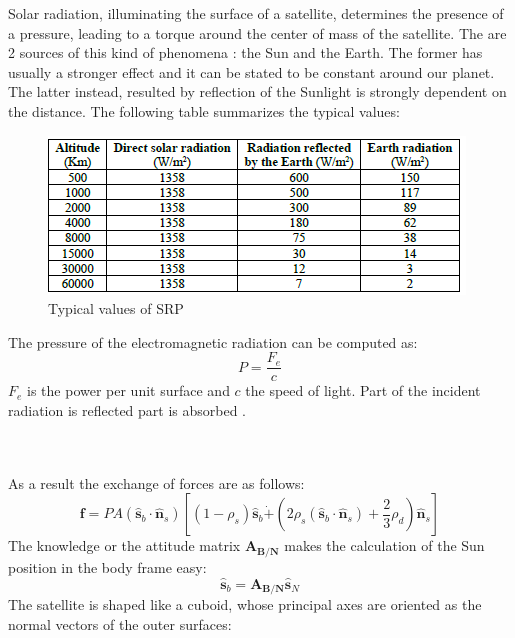 \documentclass[11pt]{article}
\begin{document}
Solar radiation, illuminating the surface of a satellite, determines the presence of a pressure, leading to a torque around the center of mass of the satellite. The are 2 sources of this kind of phenomena : the Sun and the Earth. The former has usually a stronger effect and it can be stated to be constant around our planet.  The latter instead, resulted by reflection of the Sunlight is strongly dependent on the distance. The following table summarizes the typical values:\\
\begin{minipage}{.6\textwidth}
\begin{figure} [H]
\centering 
\includegraphics[scale=1.1]{SRP1.PNG}
\caption{ Typical values of  SRP 
\cite{SRP}}
\end{figure}
\end{minipage}
\begin{minipage}{.4\textwidth}
The pressure of the electromagnetic radiation can be computed as:
\begin{equation}
P=\frac{F_e}{c}
\end{equation}
$ F_e$ is the power per unit surface and $ c$ the speed of light. 
Part of the incident radiation is reflected part is absorbed .
\end{minipage}\\\\
As a result the exchange of forces are as follows:
\begin{equation}
\mathbf{f}=PA(\hat{\mathbf{s}}_b\cdot  \hat{\mathbf{n}}_s)[(1-\rho_s)\hat{\mathbf{s}}_b\dot +(2\rho_s(\hat{\mathbf{s}}_b\cdot  \hat{\mathbf{n}}_s)+\frac{2}{3}\rho_d )\hat{\mathbf{n}}_s]
\end{equation}
The knowledge or the attitude matrix $\mathbf{A_{B/N}}$ makes the calculation of the Sun position in the body frame easy:
\begin{equation}
\hat{\mathbf{s}}_b=\mathbf{A_{B/N}}\hat{\mathbf{s}}_N
\end{equation}
The satellite is shaped like a cuboid, whose principal axes are oriented as the normal vectors of the outer surfaces:
\end{document}
